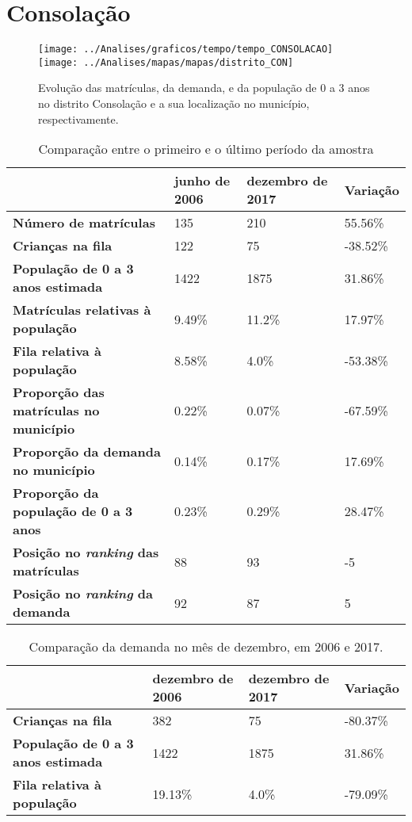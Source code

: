 \section{Consolação}
\begin{figure}[H]
	\centering
	\texttt{[image: ../Analises/graficos/tempo/tempo\_CONSOLACAO]}
	\texttt{[image: ../Analises/mapas/mapas/distrito\_CON]}
	\caption{Evolução das matrículas, da demanda, e da população de 0 a 3 anos no distrito Consolação e a sua localização no município, respectivamente.}
\end{figure}
\begin{table}[H]
	\begin{tabular}{|l|l|l|l|}
		\hline
		\textbf{}                                      & \textbf{junho de 2006}       & \textbf{dezembro de 2017}    & \textbf{Variação} \\ \hline
		\textbf{Número de matrículas}                  & 135 & 210 & 55.56\% \\ \hline
		\textbf{Crianças na fila}                      & 122 & 75 & -38.52\% \\ \hline
		\textbf{População de 0 a 3 anos estimada}      & 1422 & 1875 & 31.86\% \\ \hline
		\textbf{Matrículas relativas à população}      & 9.49\% & 11.2\% & 17.97\% \\ \hline
		\textbf{Fila relativa à população}             & 8.58\% & 4.0\% & -53.38\% \\ \hline
		\textbf{Proporção das matrículas no município} & 0.22\% & 0.07\% & -67.59\% \\ \hline
		\textbf{Proporção da demanda no município}     & 0.14\% & 0.17\% & 17.69\% \\ \hline
		\textbf{Proporção da população de 0 a 3 anos}  & 0.23\% & 0.29\% & 28.47\% \\ \hline
		\textbf{Posição no \textit{ranking} das matrículas}     & 88 & 93 & -5 \\ \hline
		\textbf{Posição no \textit{ranking} da demanda}         & 92 & 87 & 5 \\ \hline
	\end{tabular}
	\caption{Comparação entre o primeiro e o último período da amostra}
\end{table}
\begin{table}[H]
	\begin{tabular}{|l|l|l|l|}
		\hline
		\textbf{}                                 & \textbf{dezembro de 2006} & \textbf{dezembro de 2017} & \textbf{Variação} \\ \hline
		\textbf{Crianças na fila}                      & 382 & 75 & -80.37\% \\ \hline
		\textbf{População de 0 a 3 anos estimada}      & 1422 & 1875 & 31.86\% \\ \hline
		\textbf{Fila relativa à população}             & 19.13\% & 4.0\% & -79.09\% \\ \hline
	\end{tabular}
	\caption{Comparação da demanda no mês de dezembro, em 2006 e 2017.}
\end{table}
